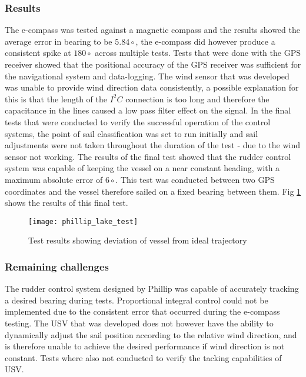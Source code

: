 \subsubsection{Results}
The e-compass was tested against a magnetic compass and the results showed the average error in bearing to be $5.84\circ$, the e-compass did however produce a consistent spike at $180\circ$ across
multiple tests. Tests that were done with the GPS receiver showed that the positional accuracy of the GPS receiver was sufficient for the navigational system and data-logging. The wind sensor that
was developed was unable to provide wind direction data consistently, a possible explanation for this is that the length of the $I^{2}C$ connection is too long and therefore the capacitance in the lines caused 
a low pass filter effect on the signal. In the final tests that were conducted to verify the successful operation of the control systems, the point of sail classification was set to run initially and sail adjustments were not taken 
throughout the duration of the test - due to the wind sensor not working. The results of the final test showed that the rudder control system was capable of keeping the vessel on a near constant 
heading, with a maximum absolute error of $6\circ$. This test was conducted between two GPS coordinates and the vessel therefore sailed on a fixed bearing between them. Fig \ref{fig:phillip_lake_test} shows
the results of this final test.

\begin{figure}[!h]
    \centering
    \texttt{[image: phillip\_lake\_test]}
    \caption[Test results from lake test]{Test results showing deviation of vessel from ideal trajectory \cite{Phillip}}
    \label{fig:phillip_lake_test}
\end{figure}

\subsubsection{Remaining challenges}
The rudder control system designed by Phillip was capable of accurately tracking a desired bearing during tests. Proportional integral control could not be implemented due to the consistent error that occurred during 
the e-compass testing. The USV that was developed does not however have the ability to dynamically adjust the sail position according to the relative wind direction, and is therefore unable to achieve the desired 
performance if wind direction is not constant. Tests where also not conducted to verify the tacking capabilities of USV.

